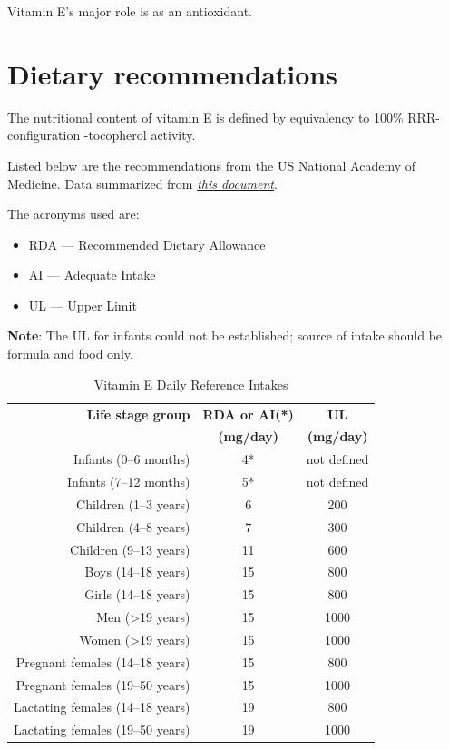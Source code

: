 \documentclass{book}
\begin{document}
\begin{sloppypar}
Vitamin E's major role is as an antioxidant.

\section{Dietary recommendations}
The nutritional content of vitamin E is defined by equivalency to 100\% RRR-configuration \textalpha -tocopherol activity.

Listed below are the recommendations from the US National Academy of Medicine. Data summarized from \href{https://nap.nationalacademies.org/read/9810/chapter/8}{\textit{this document}}.

The acronyms used are:
\begin{itemize}
	\item RDA --- Recommended Dietary Allowance
	\item AI --- Adequate Intake
	\item UL --- Upper Limit
\end{itemize}

\textbf{Note}: The UL for infants could not be established; source of intake should be formula and food only.

\begin{table}[ht]
	\caption{Vitamin E Daily Reference Intakes}
	\centering \begin{tabular}{| r | c | c |}
		\hline
		\textbf{Life stage group} & \textbf{RDA or AI(*)} & \textbf{UL}\\
		& \textbf{(mg/day)} & \textbf{(mg/day)}\\ \hline
		Infants (0--6 months) & 4* & not defined\\ \hline
		Infants (7--12 months) & 5* & not defined\\ \hline
		Children (1--3 years) & 6 & 200\\ \hline
		Children (4--8 years) & 7 & 300\\ \hline
		Children (9--13 years) & 11 & 600\\ \hline
		Boys (14--18 years) & 15 & 800\\ \hline
		Girls (14--18 years) & 15 & 800\\ \hline
		Men (\textgreater19 years) & 15 & 1000\\ \hline
		Women (\textgreater19 years) & 15 & 1000\\ \hline
		Pregnant females (14--18 years) & 15 & 800\\ \hline
		Pregnant females (19--50 years) & 15 & 1000\\ \hline
		Lactating females (14--18 years) & 19 & 800\\ \hline
		Lactating females (19--50 years) & 19 & 1000\\ \hline
	\end{tabular}
\end{table}
\newpage


\end{sloppypar}
\end{document}
